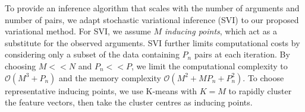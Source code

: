 To provide an inference algorithm that scales with the number of 
arguments and number of pairs, 
we adapt stochastic variational inference (SVI) 
\cite{hensman2013gaussian,hensman_scalable_2015} to our 
proposed variational method.
For SVI, we assume $M$ \emph{inducing points},%
which act as a substitute for the observed arguments.
SVI further limits computational costs by considering only a subset of the data containing $P_n$ pairs at each iteration. 
By choosing $M << N$ and $P_n << P$, we limit the computational
complexity to $\mathcal{O}(M^3 + P_n)$ and the 
memory complexity $\mathcal{O}(M^2 + MP_n + P_n^2)$.
To choose representative inducing points, 
we use K-means with $K=M$ to rapidly cluster the feature vectors, 
then take the cluster centres as inducing points.

